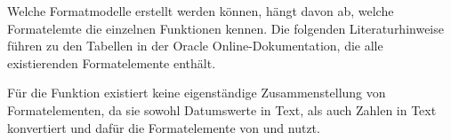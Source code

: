           Welche Formatmodelle erstellt werden k\"onnen, h\"angt davon ab, welche Formatelemte die einzelnen Funktionen kennen. Die folgenden Literaturhinweise f\"uhren zu den Tabellen in der Oracle Online-Dokumentation, die alle existierenden Formatelemente enth\"alt.
          \begin{literaturinternet}
            \item \cite{i34570}
            \item \cite{i34924}
          \end{literaturinternet}

          \begin{merke}
            F\"ur die Funktion  existiert keine eigenst\"andige Zusammenstellung von Formatelementen, da sie sowohl Datumswerte in Text, als auch Zahlen in Text konvertiert und daf\"ur die Formatelemente von  und  nutzt.
          \end{merke}
